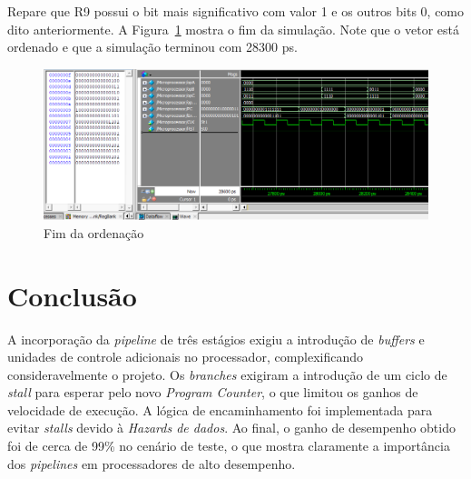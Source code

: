 \documentclass[11pt,a4paper,titlepage]{article}
\begin{document}
Repare que R9 possui o bit mais significativo com valor 1 e os outros bits 0, como dito anteriormente.
A Figura~\ref{fig:ordena2} mostra o fim da simulação.
Note que o vetor está ordenado e que a simulação terminou com 28300 ps.


\begin{figure}[!h]
\centering
\includegraphics[scale=0.5]{images/ordena2.png}
\caption{Fim da ordenação}
\label{fig:ordena2}
\end{figure}
\section{Conclusão}

A incorporação da \textit{pipeline} de três estágios exigiu a introdução de \textit{buffers} e unidades de
controle adicionais no processador, complexificando consideravelmente o projeto. Os \textit{branches} exigiram
a introdução de um ciclo de \textit{stall} para esperar pelo novo \textit{Program Counter}, o que limitou
os ganhos de velocidade de execução. A lógica de encaminhamento foi implementada para evitar \textit{stalls}
devido à \textit{Hazards de dados}. Ao final, o ganho de desempenho obtido foi de cerca de 99\% no cenário de 
teste, o que mostra claramente a importância dos \textit{pipelines} em processadores de alto desempenho.


%

\nocite{*}
\end{document}
